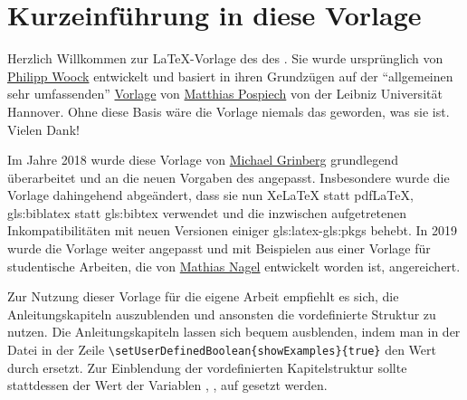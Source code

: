 %
\chapter*{Kurzeinführung in diese Vorlage}
%
%
%
%
%
Herzlich Willkommen zur \LaTeX-Vorlage
des  %
des . %
Sie wurde ursprünglich von
\href{http://ies.anthropomatik.kit.edu/mitarbeiter.php?person=woock}{Philipp Woock}
entwickelt und basiert in ihren Grundzügen auf der \enquote{allgemeinen sehr umfassenden}
\href{http://www.matthiaspospiech.de/latex/templates/thesis/}{Vorlage} von 
\href{http://www.matthiaspospiech.de}{Matthias Pospiech} von der Leibniz Universität Hannover.
Ohne diese Basis wäre die Vorlage niemals das geworden, was sie ist. Vielen Dank!

Im Jahre 2018 wurde diese Vorlage von
\href{http://ies.anthropomatik.kit.edu/mitarbeiter.php?person=grinberg}{Michael Grinberg}
grundlegend überarbeitet und an die neuen Vorgaben des  angepasst.
Insbesondere wurde die Vorlage dahingehend abgeändert, dass sie nun XeLaTeX statt pdfLaTeX, 
\gls{gls:biblatex} statt \gls{gls:bibtex} verwendet und die inzwischen aufgetretenen
Inkompatibilitäten mit neuen Versionen einiger \gls{gls:latex}-\glspl{gls:pkg} behebt.
In 2019 wurde die Vorlage weiter angepasst und mit Beispielen aus einer Vorlage
für studentische Arbeiten, die von
\href{https://crypto.iti.kit.edu/index.php?id=nagel}{Mathias Nagel}
entwickelt worden ist, angereichert.

Zur Nutzung dieser Vorlage für die eigene Arbeit empfiehlt es sich, 
die Anleitungskapiteln auszublenden und ansonsten die vordefinierte Struktur zu nutzen.
Die Anleitungskapiteln lassen sich bequem ausblenden, indem man in der Datei
 in der Zeile
\lstinline|\setUserDefinedBoolean{showExamples}{true}| 
den Wert  durch  ersetzt.
Zur Einblendung der vordefinierten Kapitelstruktur
sollte stattdessen der Wert der Variablen
,
,
\usw
auf  gesetzt werden.

